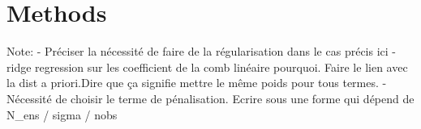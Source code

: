 
\section{Methods}


Note:
- Préciser la nécessité de faire de la régularisation dans le cas précis ici
- ridge regression sur les coefficient de la comb linéaire pourquoi. Faire le lien avec la dist a priori.Dire que ça signifie mettre le même poids pour tous termes.
- Nécessité de choisir le terme de pénalisation. Ecrire sous une forme qui dépend de N_ens / sigma / nobs